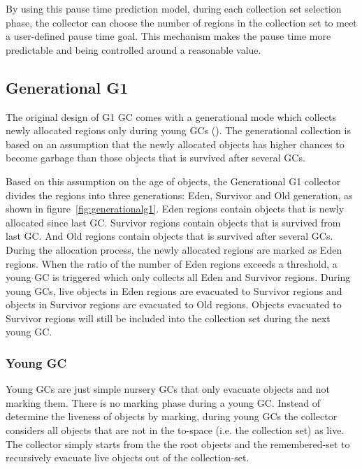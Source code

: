 By using this pause time prediction model, during each collection set selection phase,
the collector can choose the number of regions in the collection set to meet a
user-defined pause time goal. This mechanism makes the pause time more predictable
and being controlled around a reasonable value.

\subsection{Generational G1}

The original design of G1 GC comes with a generational mode which collects newly allocated regions only during young GCs (\cite{detlefs2004garbage}).
The generational collection is based on an assumption that the newly allocated objects
has higher chances to become garbage than those objects that is survived after several GCs.

Based on this assumption on the age of objects, the Generational G1 collector divides the regions into three generations: Eden, Survivor and Old generation,
as shown in figure~\ref{fig:generationalg1}.
Eden regions contain objects that is newly allocated since last GC.
Survivor regions contain objects that is survived from last GC.
And Old regions contain objects that is survived after several GCs.
During the allocation process, the newly allocated regions are marked as Eden regions.
When the ratio of the number of Eden regions exceeds a  threshold,
a young GC is triggered which only collects all Eden and Survivor regions.
During young GCs, live objects in Eden regions are evacuated to Survivor regions
and objects in Survivor regions are evacuated to Old regions.
Objects evacuated to Survivor regions will still be included into the collection set during the next young GC.

\begin{figure*}
  \centering
  \texttt{[image: \{figs/generational.png]}}
  \caption{Generational G1 Heap Structure}
  \label{fig:generationalg1}
\end{figure*}

\subsubsection{Young GC}

Young GCs are just simple nursery GCs that only evacuate objects and not marking them.
There is no marking phase during a young GC. Instead of determine the liveness of objects
by marking, during young GCs the collector considers all objects that are not in the
to-space (i.e. the collection set) as live. The collector simply starts from the the root
objects and the remembered-set to recursively evacuate live objects out of the collection-set.

